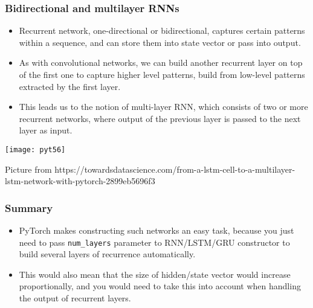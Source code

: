 \begin{frame}[fragile] \frametitle{Bidirectional and multilayer RNNs}

\begin{itemize}
\item Recurrent network, one-directional or bidirectional, captures certain patterns within a sequence, and can store them into state vector or pass into output. 
\item As with convolutional networks, we can build another recurrent layer on top of the first one to capture higher level patterns, build from low-level patterns extracted by the first layer. 
\item This leads us to the notion of multi-layer RNN, which consists of two or more recurrent networks, where output of the previous layer is passed to the next layer as input.
\end{itemize}

\begin{center}
\texttt{[image: pyt56]}
\end{center}

{\tiny Picture from https://towardsdatascience.com/from-a-lstm-cell-to-a-multilayer-lstm-network-with-pytorch-2899eb5696f3}

\end{frame}

\begin{frame}[fragile] \frametitle{Summary}

\begin{itemize}
\item PyTorch makes constructing such networks an easy task, because you just need to pass \lstinline|num_layers| parameter to RNN/LSTM/GRU constructor to build several layers of recurrence automatically. 
\item This would also mean that the size of hidden/state vector would increase proportionally, and you would need to take this into account when handling the output of recurrent layers.
\end{itemize}


\end{frame}


